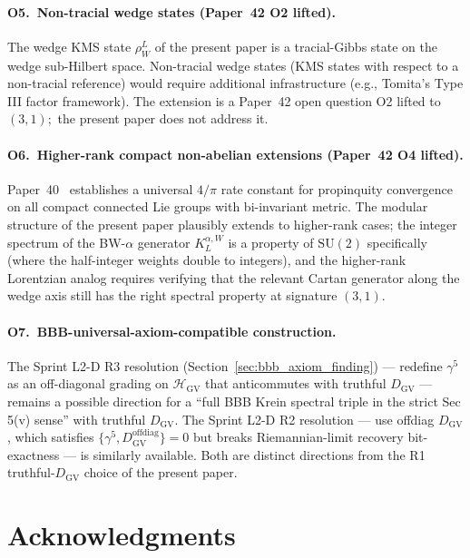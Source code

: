 \documentclass[11pt,a4paper]{article}
\theoremstyle{plain}
\theoremstyle{definition}
\newcommand{\Hilb}{\mathcal{H}}
\newcommand{\SU}{\mathrm{SU}}
\newcommand{\DGV}{D_{\mathrm{GV}}}
\newcommand{\KL}{K_{L}}
\begin{document}
\paragraph{O5.\ Non-tracial wedge states (Paper~42 O2 lifted).}
The wedge KMS state $\rho_W^L$ of the present paper is a tracial-Gibbs
state on the wedge sub-Hilbert space. Non-tracial wedge states (KMS
states with respect to a non-tracial reference) would require additional
infrastructure (e.g., Tomita's Type III factor framework). The
extension is a Paper~42 open question O2 lifted to $(3, 1)$;\
the present paper does not address it.

\paragraph{O6.\ Higher-rank compact non-abelian extensions (Paper~42 O4
lifted).} Paper~40~\cite{paper40_unified} establishes a universal
$4/\pi$ rate constant for propinquity convergence on all compact
connected Lie groups with bi-invariant metric. The modular structure
of the present paper plausibly extends to higher-rank cases; the
integer spectrum of the BW-$\alpha$ generator $\KL^{\alpha, W}$ is a
property of $\SU(2)$ specifically (where the half-integer weights
double to integers), and the higher-rank Lorentzian analog requires
verifying that the relevant Cartan generator along the wedge axis
still has the right spectral property at signature $(3, 1)$.

\paragraph{O7.\ BBB-universal-axiom-compatible construction.}
The Sprint L2-D R3 resolution
(Section~\ref{sec:bbb_axiom_finding}) — redefine $\gamma^5$ as an
off-diagonal grading on $\Hilb_{\mathrm{GV}}$ that anticommutes with
truthful $\DGV$ — remains a possible direction for a ``full BBB
Krein spectral triple in the strict Sec 5(v) sense'' with truthful
$\DGV$. The Sprint L2-D R2 resolution — use offdiag $\DGV$, which
satisfies $\{\gamma^5, \DGV^{\mathrm{offdiag}}\} = 0$ but breaks
Riemannian-limit recovery bit-exactness — is similarly available. Both
are distinct directions from the R1 truthful-$\DGV$ choice of the
present paper.

\section*{Acknowledgments}
\end{document}
